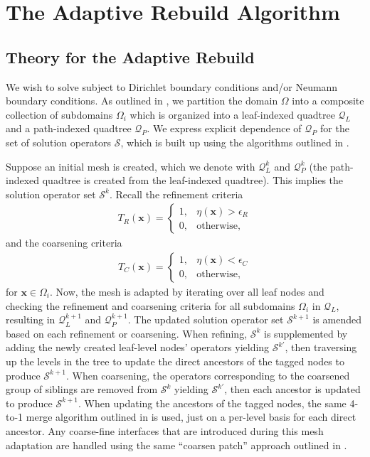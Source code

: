 \section{The Adaptive Rebuild Algorithm}
\label{sec:adaptive-rebuild-algorithm}

\subsection{Theory for the Adaptive Rebuild}

We wish to solve  subject to Dirichlet boundary conditions and/or Neumann boundary conditions. As outlined in , we partition the domain $\Omega$ into a composite collection of subdomains $\Omega_i$ which is organized into a leaf-indexed quadtree $\mathcal{Q}_{L}$ and a path-indexed quadtree $\mathcal{Q}_{P}$. We express explicit dependence of $\mathcal{Q}_{P}$ for the set of solution operators $\mathcal{S}$, which is built up using the algorithms outlined in .

Suppose an initial mesh is created, which we denote with $\mathcal{Q}^{k}_{L}$ and $\mathcal{Q}^{k}_{P}$ (the path-indexed quadtree is created from the leaf-indexed quadtree). This implies the solution operator set $\mathcal{S}^{k}$. Recall the refinement criteria
\begin{align}
    T_{R} (\textbf{x}) =
    \begin{cases}
        1,& \eta(\textbf{x}) > \epsilon_{R} \\
        0,& \text{otherwise},
    \end{cases}
\end{align}
and the coarsening criteria
\begin{align}
    T_{C} (\textbf{x}) =
    \begin{cases}
        1,& \eta(\textbf{x}) < \epsilon_{C} \\
        0,& \text{otherwise},
    \end{cases}
\end{align}
for $\textbf{x} \in \Omega_i$. Now, the mesh is adapted by iterating over all leaf nodes and checking the refinement and coarsening criteria for all subdomains $\Omega_i$ in $\mathcal{Q}_{L}$, resulting in $\mathcal{Q}^{k+1}_{L}$ and $\mathcal{Q}^{k+1}_{P}$. The updated solution operator set $\mathcal{S}^{k+1}$ is amended based on each refinement or coarsening. When refining, $\mathcal{S}^{k}$ is supplemented by adding the newly created leaf-level nodes' operators yielding $\mathcal{S}^{k'}$, then traversing up the levels in the tree to update the direct ancestors of the tagged nodes to produce $\mathcal{S}^{k+1}$. When coarsening, the operators corresponding to the coarsened group of siblings are removed from $\mathcal{S}^{k}$ yielding $\mathcal{S}^{k'}$, then each ancestor is updated to produce $\mathcal{S}^{k+1}$. When updating the ancestors of the tagged nodes, the same 4-to-1 merge algorithm outlined in  is used, just on a per-level basis for each direct ancestor. Any coarse-fine interfaces that are introduced during this mesh adaptation are handled using the same ``coarsen patch'' approach outlined in .

